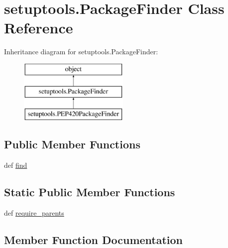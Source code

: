 \hypertarget{classsetuptools_1_1PackageFinder}{}\section{setuptools.\+Package\+Finder Class Reference}
\label{classsetuptools_1_1PackageFinder}
Inheritance diagram for setuptools.\+Package\+Finder\+:\begin{figure}[H]
\begin{center}
\leavevmode
\includegraphics[height=3.000000cm]{classsetuptools_1_1PackageFinder}
\end{center}
\end{figure}
\subsection*{Public Member Functions}
\begin{DoxyCompactItemize}
\item 
def \hyperlink{classsetuptools_1_1PackageFinder_a5beee00ee08abffe24ff500f359389f7}{find}
\end{DoxyCompactItemize}
\subsection*{Static Public Member Functions}
\begin{DoxyCompactItemize}
\item 
def \hyperlink{classsetuptools_1_1PackageFinder_a07485f09992810c8346d0743936216b3}{require\+\_\+parents}
\end{DoxyCompactItemize}


\subsection{Member Function Documentation}
\hypertarget{classsetuptools_1_1PackageFinder_a5beee00ee08abffe24ff500f359389f7}{}
